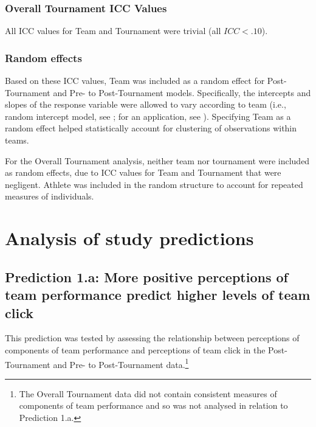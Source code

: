 \begin{CJK}{UTF8}{gbsn}
\subsubsection{Overall Tournament ICC Values}
All ICC values for Team and Tournament were trivial (all $ICC < .10$).

\subsubsection{Random effects}
Based on these ICC values, Team was included as a random effect for Post-Tournament and Pre- to Post-Tournament models.
Specifically, the intercepts and slopes of the response variable were allowed to vary according to team (i.e., random intercept model, see \textcite{Pinheiro2000}; for an application, see \textcite{Oberauer2006}).
Specifying Team as a random effect helped statistically account for clustering of observations within teams.

For the Overall Tournament analysis, neither team nor tournament were included as random effects, due to ICC values for Team and Tournament that were negligent.  Athlete was included in the random structure to account for repeated measures of individuals.















\clearpage




\section{Analysis of study predictions}




\subsection{Prediction 1.a: More positive perceptions of team performance predict higher levels of team click\label{sect:prediction1a}}

This prediction was tested by assessing the relationship between perceptions of components of team performance and perceptions of team click in the Post-Tournament and Pre- to Post-Tournament data.\footnote{The Overall Tournament data did not contain consistent measures of components of team performance and so was not analysed in relation to Prediction 1.a.}


\end{CJK}
